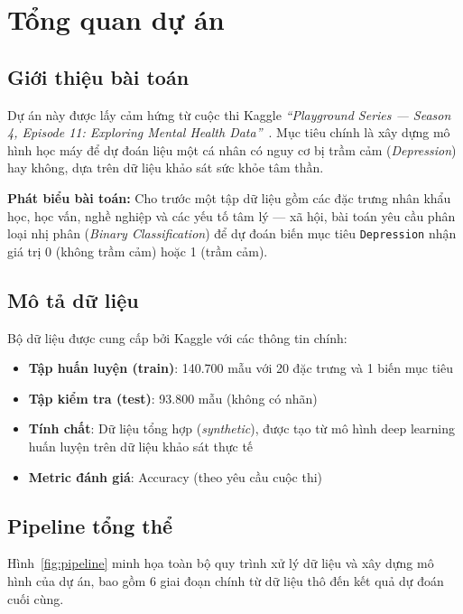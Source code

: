 \section{Tổng quan dự án}
\label{sec:overview}

\subsection{Giới thiệu bài toán}

Dự án này được lấy cảm hứng từ cuộc thi Kaggle \textit{``Playground Series --- Season 4, Episode 11: Exploring Mental Health Data''}~\cite{kaggle2024}. Mục tiêu chính là xây dựng mô hình học máy để dự đoán liệu một cá nhân có nguy cơ bị trầm cảm (\textit{Depression}) hay không, dựa trên dữ liệu khảo sát sức khỏe tâm thần.

\textbf{Phát biểu bài toán:} Cho trước một tập dữ liệu gồm các đặc trưng nhân khẩu học, học vấn, nghề nghiệp và các yếu tố tâm lý --- xã hội, bài toán yêu cầu phân loại nhị phân (\textit{Binary Classification}) để dự đoán biến mục tiêu \texttt{Depression} nhận giá trị 0 (không trầm cảm) hoặc 1 (trầm cảm).

\subsection{Mô tả dữ liệu}

Bộ dữ liệu được cung cấp bởi Kaggle với các thông tin chính:

\begin{itemize}[noitemsep]
    \item \textbf{Tập huấn luyện (train)}: 140.700 mẫu với 20 đặc trưng và 1 biến mục tiêu
    \item \textbf{Tập kiểm tra (test)}: 93.800 mẫu (không có nhãn)
    \item \textbf{Tính chất}: Dữ liệu tổng hợp (\textit{synthetic}), được tạo từ mô hình deep learning huấn luyện trên dữ liệu khảo sát thực tế
    \item \textbf{Metric đánh giá}: Accuracy (theo yêu cầu cuộc thi)
\end{itemize}

\subsection{Pipeline tổng thể}

Hình~\ref{fig:pipeline} minh họa toàn bộ quy trình xử lý dữ liệu và xây dựng mô hình của dự án, bao gồm 6 giai đoạn chính từ dữ liệu thô đến kết quả dự đoán cuối cùng.

